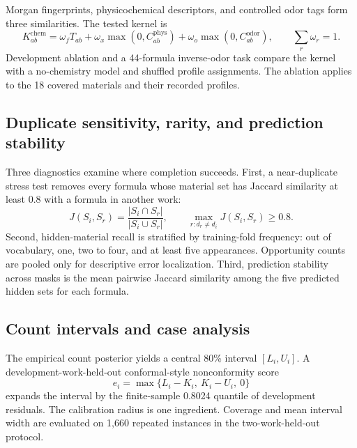 \documentclass[11pt,a4paper]{article}
\begin{document}
Morgan fingerprints, physicochemical descriptors, and controlled odor tags form three similarities. The tested kernel is
\begin{equation}
K^{\mathrm{chem}}_{ab}=\omega_f T_{ab}+
\omega_x\max(0,C^{\mathrm{phys}}_{ab})+
\omega_o\max(0,C^{\mathrm{odor}}_{ab}),\qquad
\sum_r\omega_r=1.
\label{eq:chemkernel}
\end{equation}
Development ablation and a 44-formula inverse-odor task compare the kernel with a no-chemistry model and shuffled profile assignments. The ablation applies to the 18 covered materials and their recorded profiles.

\subsection{Duplicate sensitivity, rarity, and prediction stability}

Three diagnostics examine where completion succeeds. First, a near-duplicate stress test removes every formula whose material set has Jaccard similarity at least 0.8 with a formula in another work:
\begin{equation}
J(S_i,S_r)=\frac{|S_i\cap S_r|}{|S_i\cup S_r|},
\qquad \max_{r:d_r\ne d_i}J(S_i,S_r)\ge0.8.
\label{eq:setjaccard}
\end{equation}
Second, hidden-material recall is stratified by training-fold frequency: out of vocabulary, one, two to four, and at least five appearances. Opportunity counts are pooled only for descriptive error localization. Third, prediction stability across masks is the mean pairwise Jaccard similarity among the five predicted hidden sets for each formula.

\subsection{Count intervals and case analysis}

The empirical count posterior yields a central 80\% interval $[L_i,U_i]$. A development-work-held-out conformal-style nonconformity score \citep{angelopoulos2023_conformal}
\begin{equation}
e_i=\max\{L_i-K_i,\ K_i-U_i,\ 0\}
\label{eq:countnonconformity}
\end{equation}
expands the interval by the finite-sample 0.8024 quantile of development residuals. The calibration radius is one ingredient. Coverage and mean interval width are evaluated on 1,660 repeated instances in the two-work-held-out protocol.
\end{document}
